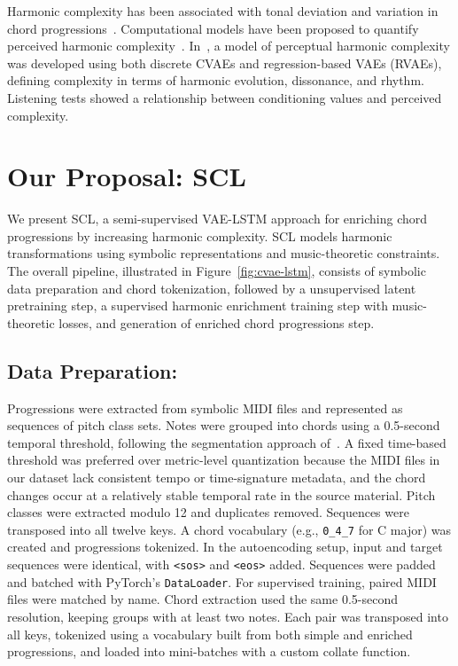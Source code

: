 \documentclass[conference]{IEEEtran}
\begin{document}
Harmonic complexity has been associated with tonal deviation and variation in chord progressions~\cite{rohrmeier2012comparing,temperley2004cognition}. Computational models have been proposed to quantify perceived harmonic complexity~\cite{digiorgi2017modeling}. In~\cite{comanducci2023vae}, a model of perceptual harmonic complexity was developed using both discrete CVAEs and regression-based VAEs (RVAEs), defining complexity in terms of harmonic evolution, dissonance, and rhythm. Listening tests showed a relationship between conditioning values and perceived complexity. 
\section{Our Proposal: SCL}
\label{sec:proposal}
We present SCL, a semi-supervised VAE-LSTM approach for enriching chord progressions by increasing harmonic complexity. SCL models harmonic transformations using symbolic representations and music-theoretic constraints. The overall pipeline, illustrated in Figure~\ref{fig:cvae-lstm}, consists of symbolic data preparation and chord tokenization, followed by a unsupervised latent pretraining step, a supervised harmonic enrichment training step with music-theoretic losses, and generation of enriched chord progressions step.
\subsection{\textbf{Data Preparation:}}
Progressions were extracted from symbolic MIDI files and represented as sequences of pitch class sets. Notes were grouped into chords using a 0.5-second temporal threshold, following the segmentation approach of~\cite{msa2023}. A fixed time-based threshold was preferred over metric-level quantization because the MIDI files in our dataset lack consistent tempo or time-signature metadata, and the chord changes occur at a relatively stable temporal rate in the source material. Pitch classes were extracted modulo 12 and duplicates removed. Sequences were transposed into all twelve keys. A chord vocabulary (e.g., \texttt{0\_4\_7} for C major) was created and progressions tokenized. In the autoencoding setup, input and target sequences were identical, with \texttt{<sos>} and \texttt{<eos>} added. Sequences were padded and batched with PyTorch’s \texttt{DataLoader}. For supervised training, paired MIDI files were matched by name. Chord extraction used the same 0.5-second resolution, keeping groups with at least two notes. Each pair was transposed into all keys, tokenized using a vocabulary built from both simple and enriched progressions, and loaded into mini-batches with a custom collate function.
\end{document}
